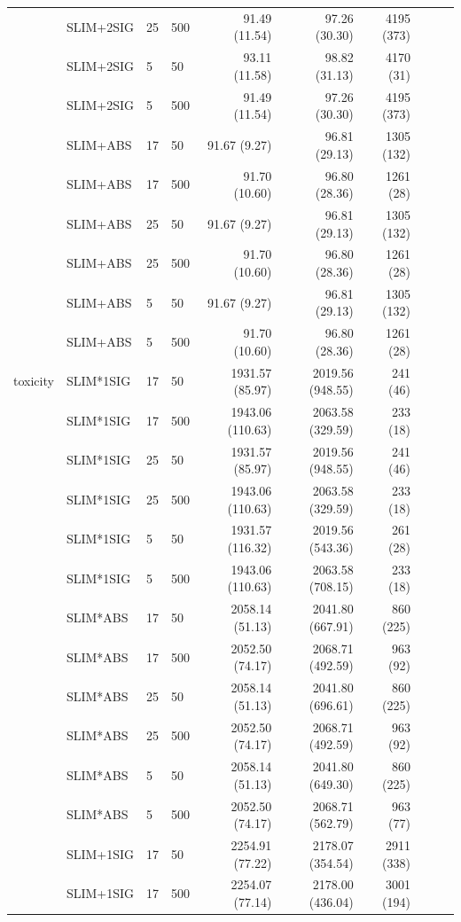 \begin{longtable}{llllrrrrrr}
 & SLIM+2SIG & 25 & 500 & 91.49 (11.54) & 97.26 (30.30) & 4195 (373) \\
 & SLIM+2SIG & 5 & 50 & 93.11 (11.58) & 98.82 (31.13) & 4170 (31) \\
 & SLIM+2SIG & 5 & 500 & 91.49 (11.54) & 97.26 (30.30) & 4195 (373) \\
 & SLIM+ABS & 17 & 50 & 91.67 (9.27) & 96.81 (29.13) & 1305 (132) \\
 & SLIM+ABS & 17 & 500 & 91.70 (10.60) & 96.80 (28.36) & 1261 (28) \\
 & SLIM+ABS & 25 & 50 & 91.67 (9.27) & 96.81 (29.13) & 1305 (132) \\
 & SLIM+ABS & 25 & 500 & 91.70 (10.60) & 96.80 (28.36) & 1261 (28) \\
 & SLIM+ABS & 5 & 50 & 91.67 (9.27) & 96.81 (29.13) & 1305 (132) \\
 & SLIM+ABS & 5 & 500 & 91.70 (10.60) & 96.80 (28.36) & 1261 (28) \\
\midrule
toxicity & SLIM*1SIG & 17 & 50 & 1931.57 (85.97) & 2019.56 (948.55) & 241 (46) \\
 & SLIM*1SIG & 17 & 500 & 1943.06 (110.63) & 2063.58 (329.59) & 233 (18) \\
 & SLIM*1SIG & 25 & 50 & 1931.57 (85.97) & 2019.56 (948.55) & 241 (46) \\
 & SLIM*1SIG & 25 & 500 & 1943.06 (110.63) & 2063.58 (329.59) & 233 (18) \\
 & SLIM*1SIG & 5 & 50 & 1931.57 (116.32) & 2019.56 (543.36) & 261 (28) \\
 & SLIM*1SIG & 5 & 500 & 1943.06 (110.63) & 2063.58 (708.15) & 233 (18) \\
 & SLIM*ABS & 17 & 50 & 2058.14 (51.13) & 2041.80 (667.91) & 860 (225) \\
 & SLIM*ABS & 17 & 500 & 2052.50 (74.17) & 2068.71 (492.59) & 963 (92) \\
 & SLIM*ABS & 25 & 50 & 2058.14 (51.13) & 2041.80 (696.61) & 860 (225) \\
 & SLIM*ABS & 25 & 500 & 2052.50 (74.17) & 2068.71 (492.59) & 963 (92) \\
 & SLIM*ABS & 5 & 50 & 2058.14 (51.13) & 2041.80 (649.30) & 860 (225) \\
 & SLIM*ABS & 5 & 500 & 2052.50 (74.17) & 2068.71 (562.79) & 963 (77) \\
 & SLIM+1SIG & 17 & 50 & 2254.91 (77.22) & 2178.07 (354.54) & 2911 (338) \\
 & SLIM+1SIG & 17 & 500 & 2254.07 (77.14) & 2178.00 (436.04) & 3001 (194) \\

\end{longtable}
